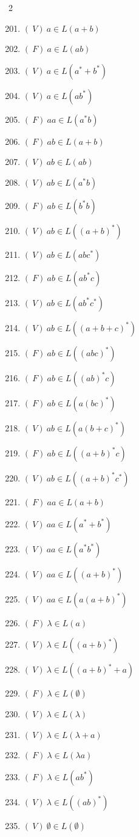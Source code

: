 \documentclass[12pt]{article}
\begin{document}
\begin{multicols}{2}
\begin{enumerate}
\setcounter{enumi}{200}

\item $(\ V)\ a \in L(a + b)$
\item $(\ F)\ a \in L(ab)$
\item $(\ V)\ a \in L(a^* + b^*)$
\item $(\ V)\ a \in L(ab^*)$
\item $(\ F)\ aa \in L(a^*b)$
\item $(\ F)\ ab \in L(a + b)$
\item $(\ V)\ ab \in L(ab)$
\item $(\ V)\ ab \in L(a^*b)$
\item $(\ F)\ ab \in L(b^*b)$
\item $(\ V)\ ab \in L((a + b)^*)$
\item $(\ V)\ ab \in L(abc^*)$
\item $(\ F)\ ab \in L(ab^*c)$
\item $(\ V)\ ab \in L(ab^*c^*)$
\item $(\ V)\ ab \in L((a + b + c)^*)$
\item $(\ F)\ ab \in L((abc)^*)$
\item $(\ F)\ ab \in L((ab)^*c)$
\item $(\ F)\ ab \in L(a(bc)^*)$
\item $(\ V)\ ab \in L(a(b + c)^*)$

\columnbreak

\item $(\ F)\ ab \in L((a + b)^*c)$
\item $(\ V)\ ab \in L((a + b)^*c^*)$
\item $(\ F)\ aa \in L(a + b)$
\item $(\ V)\ aa \in L(a^* + b^*)$
\item $(\ V)\ aa \in L(a^*b^*)$
\item $(\ V)\ aa \in L((a + b)^*)$
\item $(\ V)\ aa \in L(a(a + b)^*)$
\item $(\ F)\ \lambda \in L(a)$
\item $(\ V)\ \lambda \in L((a + b)^*)$
\item $(\ V)\ \lambda \in L((a + b)^* + a)$
\item $(\ F)\ \lambda \in L(\emptyset)$
\item $(\ V)\ \lambda \in L(\lambda)$
\item $(\ V)\ \lambda \in L(\lambda + a)$
\item $(\ F)\ \lambda \in L(\lambda a)$
\item $(\ F)\ \lambda \in L(ab^*)$
\item $(\ V)\ \lambda \in L((ab)^*)$
\item $(\ V)\ \emptyset \in L(\emptyset)$

\end{enumerate}
\end{multicols}
\end{document}
